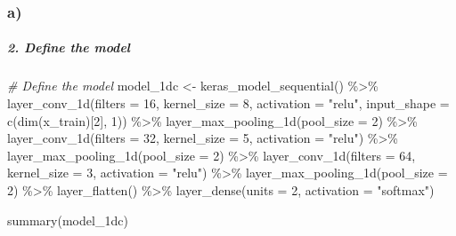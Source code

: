\documentclass[
]{article}
\newenvironment{Shaded}{\begin{snugshade}}{\end{snugshade}}
\newcommand{\AttributeTok}[1]{\textcolor[rgb]{0.77,0.63,0.00}{#1}}
\newcommand{\CommentTok}[1]{\textcolor[rgb]{0.56,0.35,0.01}{\textit{#1}}}
\newcommand{\DecValTok}[1]{\textcolor[rgb]{0.00,0.00,0.81}{#1}}
\newcommand{\FunctionTok}[1]{\textcolor[rgb]{0.00,0.00,0.00}{#1}}
\newcommand{\NormalTok}[1]{#1}
\newcommand{\OtherTok}[1]{\textcolor[rgb]{0.56,0.35,0.01}{#1}}
\newcommand{\SpecialCharTok}[1]{\textcolor[rgb]{0.00,0.00,0.00}{#1}}
\newcommand{\StringTok}[1]{\textcolor[rgb]{0.31,0.60,0.02}{#1}}
\begin{document}
\hypertarget{a-5}{%
\subsubsection{a)}\label{a-5}}

\hypertarget{define-the-model-2}{%
\subparagraph{2. Define the model}\label{define-the-model-2}}

\begin{Shaded}
\begin{Highlighting}[]
\CommentTok{\# Define the model}
\NormalTok{model\_1dc }\OtherTok{\textless{}{-}} \FunctionTok{keras\_model\_sequential}\NormalTok{() }\SpecialCharTok{\%\textgreater{}\%}
    \FunctionTok{layer\_conv\_1d}\NormalTok{(}\AttributeTok{filters =} \DecValTok{16}\NormalTok{, }\AttributeTok{kernel\_size =} \DecValTok{8}\NormalTok{, }\AttributeTok{activation =} \StringTok{"relu"}\NormalTok{, }\AttributeTok{input\_shape =} \FunctionTok{c}\NormalTok{(}\FunctionTok{dim}\NormalTok{(x\_train)[}\DecValTok{2}\NormalTok{], }\DecValTok{1}\NormalTok{)) }\SpecialCharTok{\%\textgreater{}\%}
    \FunctionTok{layer\_max\_pooling\_1d}\NormalTok{(}\AttributeTok{pool\_size =} \DecValTok{2}\NormalTok{) }\SpecialCharTok{\%\textgreater{}\%}
    \FunctionTok{layer\_conv\_1d}\NormalTok{(}\AttributeTok{filters =} \DecValTok{32}\NormalTok{, }\AttributeTok{kernel\_size =} \DecValTok{5}\NormalTok{, }\AttributeTok{activation =} \StringTok{"relu"}\NormalTok{) }\SpecialCharTok{\%\textgreater{}\%}
    \FunctionTok{layer\_max\_pooling\_1d}\NormalTok{(}\AttributeTok{pool\_size =} \DecValTok{2}\NormalTok{) }\SpecialCharTok{\%\textgreater{}\%}
    \FunctionTok{layer\_conv\_1d}\NormalTok{(}\AttributeTok{filters =} \DecValTok{64}\NormalTok{, }\AttributeTok{kernel\_size =} \DecValTok{3}\NormalTok{, }\AttributeTok{activation =} \StringTok{"relu"}\NormalTok{) }\SpecialCharTok{\%\textgreater{}\%}
    \FunctionTok{layer\_max\_pooling\_1d}\NormalTok{(}\AttributeTok{pool\_size =} \DecValTok{2}\NormalTok{) }\SpecialCharTok{\%\textgreater{}\%}
    \FunctionTok{layer\_flatten}\NormalTok{() }\SpecialCharTok{\%\textgreater{}\%}
    \FunctionTok{layer\_dense}\NormalTok{(}\AttributeTok{units =} \DecValTok{2}\NormalTok{, }\AttributeTok{activation =} \StringTok{"softmax"}\NormalTok{)}

\FunctionTok{summary}\NormalTok{(model\_1dc)}
\end{Highlighting}
\end{Shaded}
\end{document}
